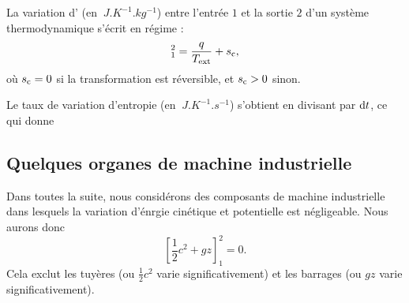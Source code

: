 \documentclass[12pt,fancy]{cours}
\begin{document}
\begin{theorem}\label{form:2principe}
La variation d’ (en $\SI{}{J.K^{-1}.kg^{-1}}$) entre l’entrée $1$ et la sortie $2$ d'un système thermodynamique  s’écrit en régime   :
\begin{equation*}
[ s]_1^2=\frac{q}{T_{\rm{ext}}}+s_{\text{c}},
\end{equation*}
où $s_{\rm c} = 0$ si la transformation est réversible, et  $s_{\rm c} > 0$ sinon.

\end{theorem}
Le taux de variation d’entropie (en  $\SI{}{J.K^{-1}.s^{-1}}$) s'obtient en divisant  par $\mathrm{d} t$, ce qui donne



\subsection{Quelques organes de machine industrielle}

Dans toutes la suite, nous considérons des composants de machine industrielle dans lesquels la variation d'énrgie cinétique et potentielle est négligeable. Nous aurons donc 
\begin{equation}
  \left[ \frac{1}{2}c^2 + gz \right]_1^2 = 0.
\end{equation}
Cela exclut les tuyères (ou $\frac{1}{2}c^2$ varie significativement) et les barrages (ou $gz$ varie significativement).

\end{document}
